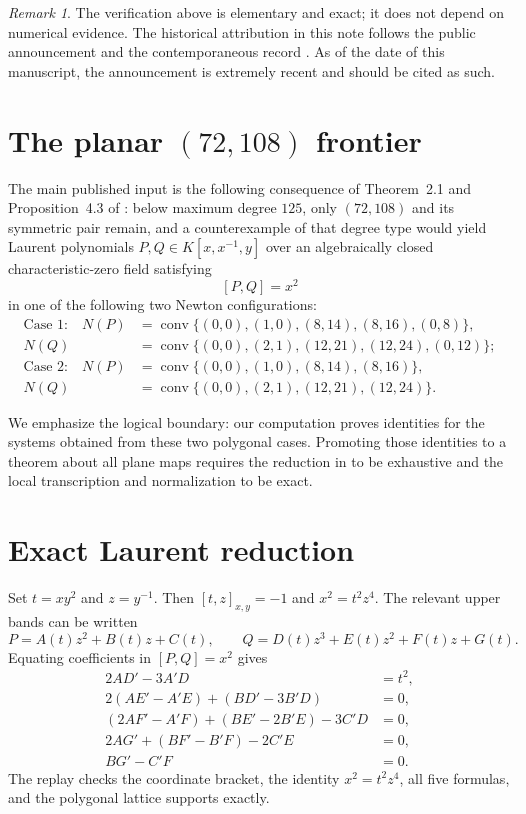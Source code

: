 \documentclass[11pt,a4paper]{article}
\theoremstyle{remark}
\newtheorem{remark}[theorem]{Remark}
\begin{document}
\begin{remark}
The verification above is elementary and exact; it does not depend on numerical evidence. The historical attribution in this note follows the public announcement \cite{Alpoge2026} and the contemporaneous record \cite{Zhang2026}. As of the date of this manuscript, the announcement is extremely recent and should be cited as such.
\end{remark}

\section{The planar $(72,108)$ frontier}

The main published input is the following consequence of Theorem~2.1 and Proposition~4.3 of \cite{GGHV2022}: below maximum degree $125$, only $(72,108)$ and its symmetric pair remain, and a counterexample of that degree type would yield Laurent polynomials $P,Q\in K[x,x^{-1},y]$ over an algebraically closed characteristic-zero field satisfying
\[
[P,Q]=x^2
\]
in one of the following two Newton configurations:
\begin{align*}
\text{Case 1:}\quad
N(P)&=\operatorname{conv}\{(0,0),(1,0),(8,14),(8,16),(0,8)\},\\
N(Q)&=\operatorname{conv}\{(0,0),(2,1),(12,21),(12,24),(0,12)\};\\[0.4em]
\text{Case 2:}\quad
N(P)&=\operatorname{conv}\{(0,0),(1,0),(8,14),(8,16)\},\\
N(Q)&=\operatorname{conv}\{(0,0),(2,1),(12,21),(12,24)\}.
\end{align*}

We emphasize the logical boundary: our computation proves identities for the systems obtained from these two polygonal cases. Promoting those identities to a theorem about all plane maps requires the reduction in \cite{GGHV2022} to be exhaustive and the local transcription and normalization to be exact.

\section{Exact Laurent reduction}

Set $t=xy^2$ and $z=y^{-1}$. Then $[t,z]_{x,y}=-1$ and $x^2=t^2z^4$. The relevant upper bands can be written
\[
P=A(t)z^2+B(t)z+C(t),\qquad
Q=D(t)z^3+E(t)z^2+F(t)z+G(t).
\]
Equating coefficients in $[P,Q]=x^2$ gives
\begin{align*}
2AD'-3A'D&=t^2, \tag{J4}\label{eq:J4}\\
2(AE'-A'E)+(BD'-3B'D)&=0, \tag{J3}\label{eq:J3}\\
(2AF'-A'F)+(BE'-2B'E)-3C'D&=0, \tag{J2}\label{eq:J2}\\
2AG'+(BF'-B'F)-2C'E&=0, \tag{J1}\label{eq:J1}\\
BG'-C'F&=0. \tag{J0}\label{eq:J0}
\end{align*}
The replay checks the coordinate bracket, the identity $x^2=t^2z^4$, all five formulas, and the polygonal lattice supports exactly.
\end{document}

